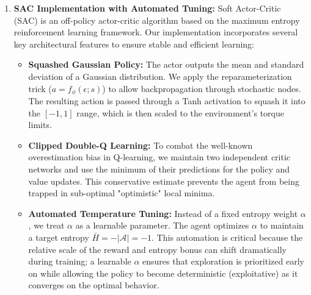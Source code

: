 \documentclass[12pt]{scrartcl}
\begin{document}
\begin{enumerate}
    \item \textbf{SAC Implementation with Automated Tuning:} Soft Actor-Critic (SAC) is an off-policy actor-critic algorithm based on the maximum entropy reinforcement learning framework. Our implementation incorporates several key architectural features to ensure stable and efficient learning:
    \begin{itemize}
        \item \textbf{Squashed Gaussian Policy:} The actor outputs the mean and standard deviation of a Gaussian distribution. We apply the reparameterization trick ($a = f_\phi(\epsilon; s)$) to allow backpropagation through stochastic nodes. The resulting action is passed through a Tanh activation to squash it into the $[-1, 1]$ range, which is then scaled to the environment's torque limits.
        \item \textbf{Clipped Double-Q Learning:} To combat the well-known overestimation bias in Q-learning, we maintain two independent critic networks and use the minimum of their predictions for the policy and value updates. This conservative estimate prevents the agent from being trapped in sub-optimal "optimistic" local minima.
        \item \textbf{Automated Temperature Tuning:} Instead of a fixed entropy weight $\alpha$, we treat $\alpha$ as a learnable parameter. The agent optimizes $\alpha$ to maintain a target entropy $\bar{H} = -|\mathcal{A}| = -1$. This automation is critical because the relative scale of the reward and entropy bonus can shift dramatically during training; a learnable $\alpha$ ensures that exploration is prioritized early on while allowing the policy to become deterministic (exploitative) as it converges on the optimal behavior.
    \end{itemize}


\end{enumerate}
\end{document}
